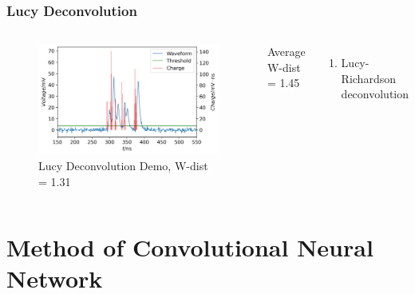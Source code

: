 \documentclass[handout]{beamer}
\begin{document}
\begin{frame}
\frametitle{Lucy Deconvolution}
\begin{columns}
\begin{figure}
    \centering
    \caption{Lucy Deconvolution Demo, W-dist = 1.31}
    \includegraphics[width=1.0\linewidth]{img/lucyddm.png}
\end{figure}
\vspace{-4mm}
\begin{center}
    Average W-dist = 1.45
\end{center}
\begin{enumerate}
    \item Lucy-Richardson deconvolution
\end{enumerate}
\end{columns}
\end{frame}

\section{Method of Convolutional Neural Network}
\end{document}
